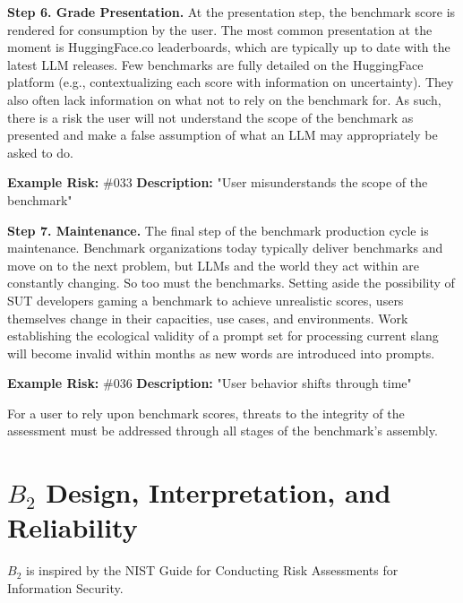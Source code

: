 \documentclass{article}
\begin{document}
{\bf Step 6. Grade Presentation.} At the presentation step, the benchmark score is rendered for consumption by the user. The most common presentation at the moment is HuggingFace.co leaderboards, which are typically up to date with the latest LLM releases. Few benchmarks are fully detailed on the HuggingFace platform (e.g., contextualizing each score with information on uncertainty). They also often lack information on what not to rely on the benchmark for. As such, there is a risk the user will not understand the scope of the benchmark as presented and make a false assumption of what an LLM may appropriately be asked to do.

\begin{center}
    \begin{tcolorbox}[colback=gray!10, colframe=black!50, width=\textwidth, boxrule=0.5mm, sharp corners, coltext=black]
        {\bf Example Risk:} \#033
        \newline
        {\bf Description:} "User misunderstands the scope of the benchmark"
    \end{tcolorbox}
\end{center}

{\bf Step 7. Maintenance.} The final step of the benchmark production cycle is maintenance. Benchmark organizations today typically deliver benchmarks and move on to the next problem, but LLMs and the world they act within are constantly changing. So too must the benchmarks. Setting aside the possibility of SUT developers gaming a benchmark to achieve unrealistic scores, users themselves change in their capacities, use cases, and environments. Work establishing the ecological validity of a prompt set for processing current slang will become invalid within months as new words are introduced into prompts.

\begin{center}
    \begin{tcolorbox}[colback=gray!10, colframe=black!50, width=\textwidth, boxrule=0.5mm, sharp corners, coltext=black]
        {\bf Example Risk:} \#036
        \newline
        {\bf Description:} "User behavior shifts through time"
    \end{tcolorbox}
\end{center}

For a user to rely upon benchmark scores, threats to the integrity of the assessment must be addressed through all stages of the benchmark's assembly.

\section{\(B_2\) Design, Interpretation, and Reliability}
\(B_2\) is inspired by the NIST Guide for Conducting Risk Assessments for Information Security.
\end{document}
